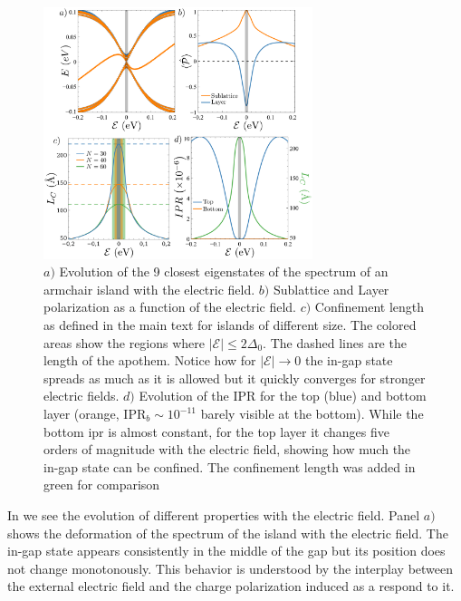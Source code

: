 \begin{figure}[!ht!]
\centering
\includegraphics[width=0.7\textwidth]{artlat/fig/spectrum.pdf}
\vspace{-10pt}
\caption{$a)$ Evolution of the 9 closest eigenstates of the spectrum of an armchair island with the electric field. $b)$ Sublattice and Layer polarization as a function of the electric field. $c)$ Confinement length as defined in the main text for islands of different size. The colored areas show the regions where $|\mathcal{E}|\leqslant2\Delta_0$. The dashed lines are the length of the apothem. Notice how for $|\mathcal{E}|\to0$ the in-gap state spreads as much as it is allowed but it quickly converges for stronger electric fields. $d)$ Evolution of the IPR for the top (blue) and bottom layer (orange, $\text{IPR}_b\sim10^{-11}$ barely visible at the bottom). While the bottom \ac{ipr} is almost constant, for the top layer it changes five orders of magnitude with the electric field, showing how much the in-gap state can be confined. The confinement length was added in green for comparison}
\label{spectrum}
\end{figure}
In  we see the evolution of different properties with the electric field. Panel $a)$ shows the deformation of the spectrum of the island with the electric field. The in-gap state appears consistently in the middle of the gap but its position does not change monotonously. This behavior is understood by the interplay between the external electric field and the charge polarization induced as a respond to it.

